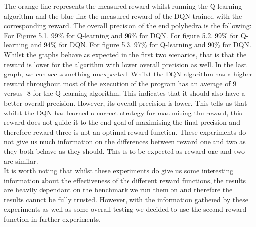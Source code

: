 The orange line represents the measured reward whilst running the Q-learning algorithm and the blue line the measured reward of the DQN trained with the corresponding reward. The overall precision of the end polyhedra is the following: For Figure 5.1. 99\% for Q-learning and 96\% for DQN. For figure 5.2. 99\% for Q-learning and 94\% for DQN. For figure 5.3. 97\% for Q-learning and 90\% for DQN. Whilst the graphs behave as expected in the first two scenarios, that is that the reward is lower for the algorithm with lower overall precision as well. In the last graph, we can see something unexpected. Whilst the DQN algorithm has a higher reward throughout most of the execution of the program has an average of 9 versus -8 for the Q-learning algorithm. This indicates that it should also have a better overall precision. However, its overall precision is lower. This tells us that whilst the DQN has learned a correct strategy for maximising the reward, this reward does not guide it to the end goal of maximising the final precision and therefore reward three is not an optimal reward function. These experiments do not give us much information on the differences between reward one and two as they both behave as they should. This is to be expected as reward one and two are similar.\\
It is worth noting that whilst these experiments do give us some interesting information about the effectiveness of the different reward functions, the results are heavily dependant on the benchmark we run them on and therefore the results cannot be fully trusted. However, with the information gathered by these experiments as well as some overall testing we decided to use the second reward function in further experiments.


